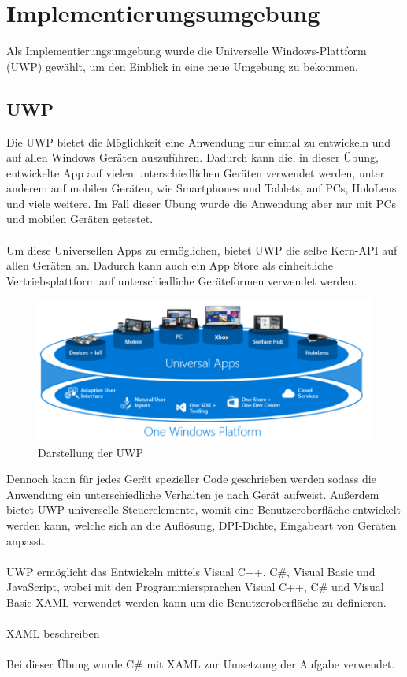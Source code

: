 
\section{Implementierungsumgebung}

Als Implementierungsumgebung wurde die Universelle Windows-Plattform (UWP) gewählt, um den Einblick in eine neue Umgebung zu bekommen.

\subsection{UWP}

Die UWP bietet die Möglichkeit eine Anwendung nur einmal zu entwickeln und auf allen Windows Geräten auszuführen. Dadurch kann die, in dieser Übung, entwickelte App auf vielen unterschiedlichen Geräten verwendet werden, unter anderem auf mobilen Geräten, wie Smartphones und Tablets, auf PCs, HoloLens und viele weitere. Im Fall dieser Übung wurde die Anwendung aber nur mit PCs und mobilen Geräten getestet.
\\\\
Um diese Universellen Apps zu ermöglichen, bietet UWP die selbe Kern-API auf allen Geräten an. Dadurch kann auch ein App Store als einheitliche Vertriebsplattform auf unterschiedliche Geräteformen verwendet werden.

\begin{figure}
	\centering
	\includegraphics[width=0.7\linewidth]{images/screenshot001}
	\caption{Darstellung der UWP}
	\label{fig:screenshot001}
\end{figure}

Dennoch kann für jedes Gerät spezieller Code geschrieben werden sodass die Anwendung ein unterschiedliche Verhalten je nach Gerät aufweist. Außerdem bietet UWP universelle Steuerelemente, womit eine Benutzeroberfläche entwickelt werden kann, welche sich an die Auflösung, DPI-Dichte, Eingabeart von Geräten anpasst.
\\\\
UWP ermöglicht das Entwickeln mittels Visual C++, C\#, Visual Basic und JavaScript, wobei mit den Programmiersprachen Visual C++, C\# und Visual Basic XAML verwendet werden kann um die Benutzeroberfläche zu definieren. \cite{UWPAllgemein}
\\\\
XAML beschreiben
\\\\
Bei dieser Übung wurde C\# mit XAML zur Umsetzung der Aufgabe verwendet.

